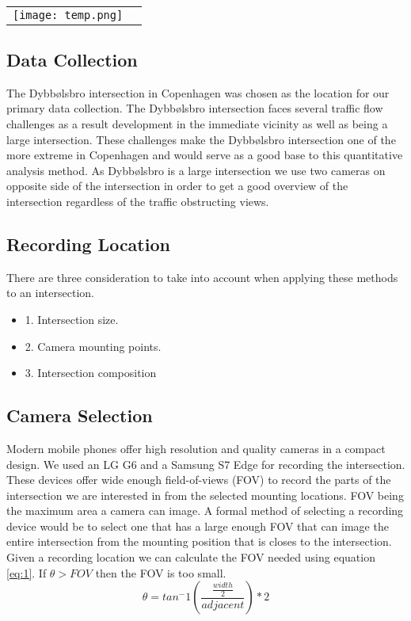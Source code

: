 \ \\ 
\noindent
\begin{tabular}{@{}cc}
\texttt{[image: temp.png]} 
\end{tabular}
\label{pipeline}

\subsection{Data Collection}

The Dybbølsbro intersection in Copenhagen was chosen as the location for our primary data collection. 
The Dybbølsbro intersection faces several traffic flow challenges as a result development in the immediate vicinity as well as being a large intersection.
These challenges make the Dybbølsbro intersection one of the more extreme in Copenhagen and would serve as a good base to this quantitative analysis method. 
As Dybbølsbro is a large intersection we use two cameras on opposite side of the intersection in order to get a good overview of the intersection regardless of the traffic obstructing views.

\subsection{Recording Location}

There are three consideration to take into account when applying these methods to an intersection.
\begin{itemize}
	\item1. Intersection size.
	\item2. Camera mounting points.
	\item3. Intersection composition
\end{itemize}

\subsection{Camera Selection}

Modern mobile phones offer high resolution and quality cameras in a compact design. We used an LG G6 and a Samsung S7 Edge for recording the intersection.
These devices offer wide enough field-of-views (FOV) to record the parts of the intersection we are interested in from the selected mounting locations.
FOV being the maximum area a camera can image. A formal method of selecting a recording device would be to select one that has a large enough FOV that can image the entire intersection 
from the mounting position that is closes to the intersection. Given a recording location we can calculate the FOV needed using equation \ref{eq:1}.
If $\theta > FOV$ then the FOV is too small.
\begin{equation}
    \theta = tan^-1(\frac{\frac{width}{2}}{adjacent}) * 2\label{eq:1}
  \end{equation}

